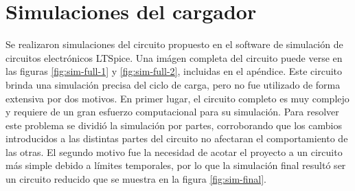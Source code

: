 \section{Simulaciones del cargador}

Se realizaron simulaciones del circuito propuesto en el software de simulación de circuitos electrónicos LTSpice.
Una imágen completa del circuito puede verse en las figuras \ref{fig:sim-full-1} y \ref{fig:sim-full-2}, incluidas en el apéndice.
Este circuito brinda una simulación precisa del ciclo de carga, pero no fue utilizado de forma extensiva por dos motivos.
En primer lugar, el circuito completo es muy complejo y requiere de un gran esfuerzo computacional para su simulación.
Para resolver este problema se dividió la simulación por partes,
corroborando que los cambios introducidos a las distintas partes del circuito no afectaran el comportamiento de las otras.
El segundo motivo fue la necesidad de acotar el proyecto a un circuito más simple debido a límites temporales,
por lo que la simulación final resultó ser un circuito reducido que se muestra en la figura \ref{fig:sim-final}.

